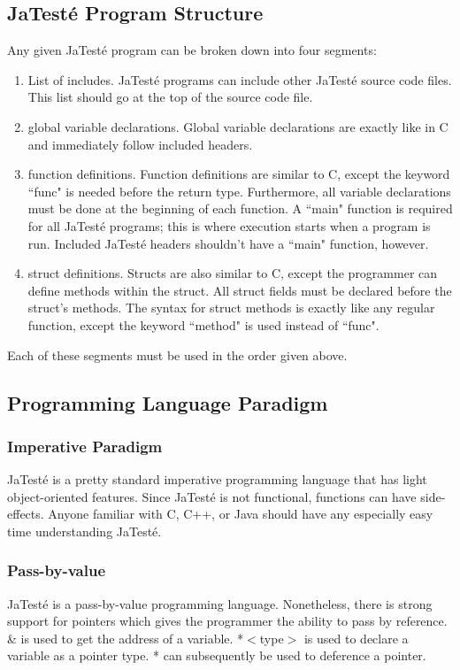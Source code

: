 \documentclass{article}
\begin{document}
\subsection{JaTest\'{e} Program Structure}
Any given JaTest\'{e} program can be broken down into four segments: 
\begin{enumerate}
\item List of includes. JaTest\'{e} programs can include other JaTest\'{e} source code files. This list should go at the top of the source code file.
\item global variable declarations. Global variable declarations are exactly like in C and immediately follow included headers. 
\item function definitions. Function definitions are similar to C, except the keyword ``func" is needed before the return type. Furthermore, all variable declarations must be done at the beginning of each function. A ``main" function is required for all JaTest\'{e} programs; this is where execution starts when a program is run. Included JaTest\'{e} headers shouldn't have a ``main" function, however.
\item struct definitions. Structs are also similar to C, except the programmer can define methods within the struct. All struct fields must be declared before the struct's methods. The syntax for struct methods is exactly like any regular function, except the keyword ``method" is used instead of ``func".
\end{enumerate}

Each of these segments must be used in the order given above.  

\subsection{Programming Language Paradigm}
\subsubsection{Imperative Paradigm}
JaTest\'{e} is a pretty standard imperative programming language that has light object-oriented features. Since JaTest\'{e} is not functional, functions can have side-effects. Anyone familiar with C, C++, or Java should have any especially easy time understanding JaTest\'{e}. 
\subsubsection{Pass-by-value}
JaTest\'{e} is a pass-by-value programming language. Nonetheless, there is strong support for pointers which gives the programmer the ability to pass by reference. \& is used to get the address of a variable.  *$<$type$>$ is used to declare a variable as a pointer type. * can subsequently be used to deference a pointer.
\end{document}
